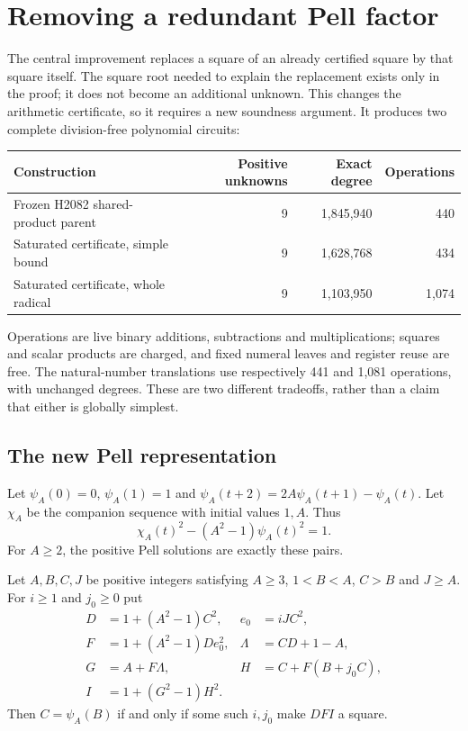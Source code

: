 \section{Removing a redundant Pell factor}
\label{nine-section}

The central improvement replaces a square of an already certified square
by that square itself.  The square root needed to explain the replacement
exists only in the proof; it does not become an additional unknown.
This changes the arithmetic certificate, so it requires a new soundness
argument.  It produces two complete division-free polynomial circuits:
\begin{center}
\begin{tabular}{lrrr}
Construction & Positive unknowns & Exact degree & Operations\\\hline
Frozen H2082 shared-product parent &9&1,845,940&440\\
Saturated certificate, simple bound &9&1,628,768&434\\
Saturated certificate, whole radical &9&1,103,950&1,074
\end{tabular}
\end{center}
Operations are live binary additions, subtractions and multiplications;
squares and scalar products are charged, and fixed numeral leaves and
register reuse are free.  The natural-number translations use respectively
441 and 1,081 operations, with unchanged degrees.  These are two different
tradeoffs, rather than a claim that either is globally simplest.

\subsection{The new Pell representation}

Let $\psi_A(0)=0$, $\psi_A(1)=1$ and
$\psi_A(t+2)=2A\psi_A(t+1)-\psi_A(t)$.  Let $\chi_A$ be the companion
sequence with initial values $1,A$.  Thus
\[
 \chi_A(t)^2-(A^2-1)\psi_A(t)^2=1.
\]
For $A\ge2$, the positive Pell solutions are exactly these pairs.

\begin{theorem}
\label{nine-saturation}
Let $A,B,C,J$ be positive integers satisfying
$A\ge3$, $1<B<A$, $C>B$ and $J\ge A$.  For $i\ge1$ and $j_0\ge0$ put
\begin{align*}
 D&=1+(A^2-1)C^2,&e_0&=iJC^2,\\
 F&=1+(A^2-1)De_0^2,&\Lambda&=CD+1-A,\\
 G&=A+F\Lambda,&H&=C+F(B+j_0C),\\
 I&=1+(G^2-1)H^2.&&
\end{align*}
Then $C=\psi_A(B)$ if and only if some such $i,j_0$ make $DFI$ a square.
\end{theorem}

